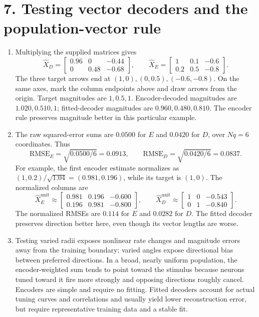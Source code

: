 \documentclass[10pt,letterpaper]{article}
\begin{document}
\section*{7. Testing vector decoders and the population-vector rule}
\begin{enumerate}[label=\textbf{7\alph*.}]
\item Multiplying the supplied matrices gives
\[
\boxed{\hat X_D=\begin{bmatrix}0.96&0&-0.44\\0&0.48&-0.68\end{bmatrix}},\qquad
\boxed{\hat X_E=\begin{bmatrix}1&0.1&-0.6\\0.2&0.5&-0.8\end{bmatrix}}.
\]
The three target arrows end at \((1,0),(0,0.5),(-0.6,-0.8)\). On the same axes, mark the column endpoints above and draw arrows from the origin. Target magnitudes are \(1,0.5,1\). Encoder-decoded magnitudes are \(1.020,0.510,1\); fitted-decoder magnitudes are \(0.960,0.480,0.810\). The encoder rule preserves magnitude better in this particular example.
\item The raw squared-error sums are \(0.0500\) for \(E\) and \(0.0420\) for \(D\), over \(Nq=6\) coordinates. Thus
\[
\boxed{\mathrm{RMSE}_E=\sqrt{0.0500/6}=0.0913},\qquad
\boxed{\mathrm{RMSE}_D=\sqrt{0.0420/6}=0.0837}.
\]
For example, the first encoder estimate normalizes as
\((1,0.2)/\sqrt{1.04}=(0.981,0.196)\), while its target is \((1,0)\). The normalized columns are
\[
\hat X_E^{\mathrm{unit}}\approx\begin{bmatrix}0.981&0.196&-0.600\\0.196&0.981&-0.800\end{bmatrix},\qquad
\hat X_D^{\mathrm{unit}}\approx\begin{bmatrix}1&0&-0.543\\0&1&-0.840\end{bmatrix}.
\]
The normalized RMSEs are \(\boxed{0.114\text{ for }E}\) and \(\boxed{0.0282\text{ for }D}\). The fitted decoder preserves direction better here, even though its vector lengths are worse.
\item Testing varied radii exposes nonlinear rate changes and magnitude errors away from the training boundary; varied angles expose directional bias between preferred directions. In a broad, nearly uniform population, the encoder-weighted sum tends to point toward the stimulus because neurons tuned toward it fire more strongly and opposing directions roughly cancel. Encoders are simple and require no fitting. Fitted decoders account for actual tuning curves and correlations and usually yield lower reconstruction error, but require representative training data and a stable fit.
\end{enumerate}
\end{document}
